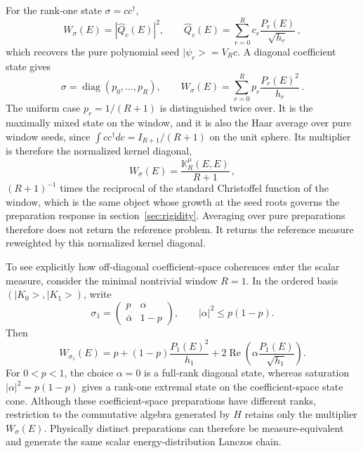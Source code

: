 \documentclass[a4paper,11pt]{article}
\def\ket#1{|#1>}%
\def\dd{d}%
\theoremstyle{definition}
\theoremstyle{remark}
\newcommand{\ket}[1]{|#1\rangle}
\newcommand{\dd}{\mathrm d}
\newcommand{\diag}{\operatorname{diag}}
\newcommand{\Qhat}{\widehat Q}
\begin{document}
For the rank-one state $\sigma=cc^\dagger$,
\begin{equation}
   W_\sigma(E)=|\Qhat_c(E)|^2,
   \qquad
   \Qhat_c(E)=\sum_{r=0}^{R}c_r
      \frac{P_r(E)}{\sqrt{h_r}}\,,
   \label{eq:mixed-rank-one-app}
\end{equation}
which recovers the pure polynomial seed
$\ket{\psi_c}=V_Rc$.  A diagonal coefficient state gives
\begin{equation}
   \sigma=\diag(p_0,\ldots,p_R),
   \qquad
   W_\sigma(E)=\sum_{r=0}^{R}p_r\frac{P_r(E)^2}{h_r}\,.
   \label{eq:mixed-diagonal-app}
\end{equation}
The uniform case $p_r=1/(R+1)$ is distinguished twice over. It is the maximally mixed state
on the window, and it is also the Haar average over pure window seeds, since
$\int cc^\dagger\dd c=I_{R+1}/(R+1)$ on the unit sphere. Its multiplier is therefore the normalized
kernel diagonal,
\begin{equation}
   W_\sigma(E)=\frac{\mathbb K_R^\mu(E,E)}{R+1}\,,
   \label{eq:mixed-haar-christoffel-app}
\end{equation}
$(R+1)^{-1}$ times the
reciprocal of the standard Christoffel function of the window, which is the same object whose growth at
the seed roots governs the preparation response in section~\ref{sec:rigidity}. Averaging over pure
preparations therefore does not return the reference problem. It returns the reference measure
reweighted by this normalized kernel diagonal.

To see explicitly how off-diagonal coefficient-space coherences enter the
scalar measure, consider the minimal nontrivial window $R=1$.  In the
ordered basis $(\ket{K_0},\ket{K_1})$, write
\begin{equation}
   \sigma_1=
   \begin{pmatrix}
      p & \alpha\\
      \bar\alpha & 1-p
   \end{pmatrix},
   \qquad
   |\alpha|^2\le p(1-p).
\end{equation}
Then
\begin{equation}
   W_{\sigma_1}(E)=
   p+(1-p)\frac{P_1(E)^2}{h_1}
   +2\operatorname{Re}\!\left(
      \alpha\frac{P_1(E)}{\sqrt{h_1}}
   \right).
   \label{eq:mixed-two-site-weight-app}
\end{equation}
For $0<p<1$, the choice $\alpha=0$ is a full-rank diagonal state,
whereas saturation $|\alpha|^2=p(1-p)$ gives a rank-one extremal state
on the coefficient-space state cone.  %
Although these coefficient-space preparations have different ranks, restriction to the
commutative algebra generated by $H$ retains only the multiplier $W_\sigma(E)$.  Physically
distinct preparations can therefore be measure-equivalent and generate the same scalar
energy-distribution Lanczos chain.
\end{document}
